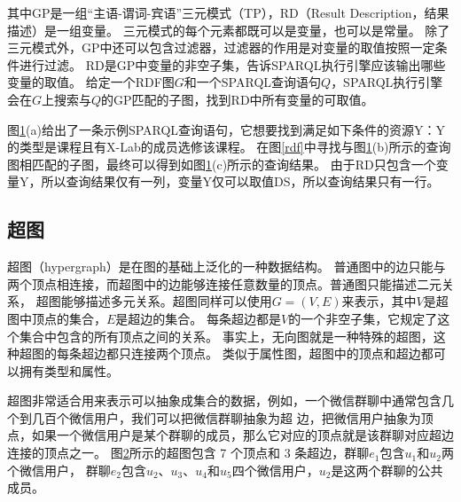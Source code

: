 其中GP是一组“主语-谓词-宾语”三元模式（TP），RD（Result Description，结果描述）是一组变量。
三元模式的每个元素都既可以是变量，也可以是常量。
除了三元模式外，GP中还可以包含过滤器，过滤器的作用是对变量的取值按照一定条件进行过滤。
RD是GP中变量的非空子集，告诉SPARQL执行引擎应该输出哪些变量的取值。
给定一个RDF图$G$和一个SPARQL查询语句$Q$，SPARQL执行引擎会在$G$上搜索与$Q$的GP匹配的子图，找到RD中所有变量的可取值。

图\ref{sparql}(a)给出了一条示例SPARQL查询语句，它想要找到满足如下条件的资源Y：Y的类型是课程且有X-Lab的成员选修该课程。
在图\ref{rdf}中寻找与图\ref{sparql}(b)所示的查询图相匹配的子图，最终可以得到如图\ref{sparql}(c)所示的查询结果。
由于RD只包含一个变量Y，所以查询结果仅有一列，变量Y仅可以取值DS，所以查询结果只有一行。

\begin{figure}[htb] 
\label{sparql}
\end{figure}

\subsection{超图}
超图（hypergraph）是在图的基础上泛化的一种数据结构。
普通图中的边只能与两个顶点相连接，而超图中的边能够连接任意数量的顶点。普通图只能描述二元关系，
超图能够描述多元关系。超图同样可以使用$G=(V,E)$来表示，其中$V$是超图中顶点的集合，$E$是超边的集合。
每条超边都是$V$的一个非空子集，它规定了这个集合中包含的所有顶点之间的关系。
事实上，无向图就是一种特殊的超图，这种超图的每条超边都只连接两个顶点。
类似于属性图，超图中的顶点和超边都可以拥有类型和属性。

超图非常适合用来表示可以抽象成集合的数据，例如，一个微信群聊中通常包含几个到几百个微信用户，我们可以把微信群聊抽象为超
边，把微信用户抽象为顶点，如果一个微信用户是某个群聊的成员，那么它对应的顶点就是该群聊对应超边连接的顶点之一。
图\ref{hyper}所示的超图包含 7 个顶点和 3 条超边，群聊$e_1$包含$u_1$和$u_2$两个微信用户，
群聊$e_2$包含$u_2$、$u_3$、$u_4$和$u_5$四个微信用户，$u_2$是这两个群聊的公共成员。

\begin{figure}[htb] 
\label{hyper}
\end{figure}

